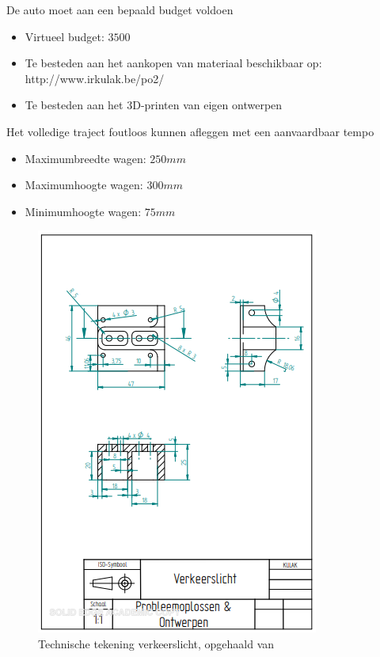 \documentclass[12pt]{article}
\begin{document}
De auto moet aan een bepaald budget voldoen
\begin{itemize}
\item Virtueel budget: $3500$
\item Te besteden aan het aankopen van materiaal beschikbaar op:  	http://www.irkulak.be/po2/

\item Te besteden aan het 3D-printen van eigen ontwerpen
\end{itemize}
\bigskip
Het volledige traject foutloos kunnen afleggen met een aanvaardbaar tempo
\begin{itemize}
	\item Maximumbreedte wagen: $250mm$
	\item Maximumhoogte wagen: $300mm$
	\item Minimumhoogte wagen: $75mm$
	
	
\end{itemize}
\bigskip
\begin{figure}
	\centering
	\includegraphics[width=.8\textwidth]{verkeerslicht}
	\caption{Technische tekening verkeerslicht, opgehaald van \cite{artikel1} }
	\label{fig: verkeerslicht}
\end{figure}
\end{document}
